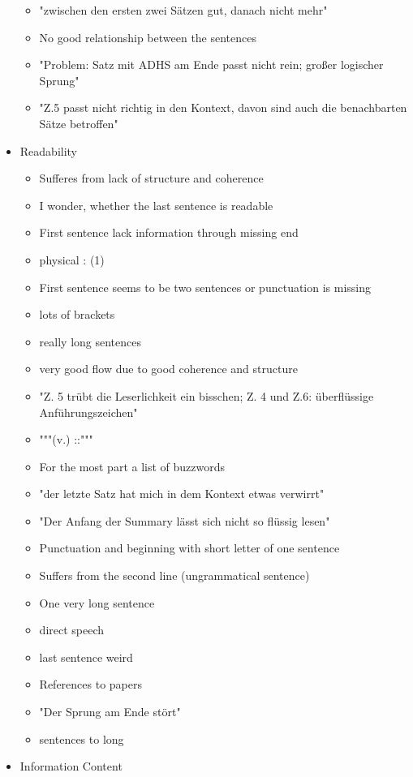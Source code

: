 \begin{itemize}[topsep = 0pt, itemsep = 0pt]
\begin{itemize}[topsep = 0pt, itemsep = 0pt]
		\item "zwischen den ersten zwei Sätzen gut, danach nicht mehr"
		\item No good relationship between the sentences
		\item "Problem: Satz mit ADHS am Ende passt nicht rein; großer logischer Sprung"
		\item "Z.5 passt nicht richtig in den Kontext, davon sind auch die benachbarten Sätze betroffen"
	\end{itemize}
	\item Readability
	\begin{itemize}[topsep = 0pt, itemsep = 0pt]
		\item Sufferes from lack of structure and coherence
		\item I wonder, whether the last sentence is readable
		\item First sentence lack information through missing end
		\item physical : (1)
		\item First sentence seems to be two sentences or punctuation is missing
		\item lots of brackets
		\item really long sentences
		\item very good flow due to good coherence and structure
		\item "Z. 5 trübt die Leserlichkeit ein bisschen; Z. 4 und Z.6: überflüssige Anführungszeichen"
		\item """(v.) ::"""
		\item For the most part a list of buzzwords
		\item "der letzte Satz hat mich in dem Kontext etwas verwirrt"
		\item "Der Anfang der Summary lässt sich nicht so flüssig lesen"
		\item Punctuation and beginning with short letter of one sentence
		\item Suffers from the second line (ungrammatical sentence)
		\item One very long sentence
		\item direct speech
		\item last sentence weird
		\item References to papers
		\item "Der Sprung am Ende stört"
		\item sentences to long
	\end{itemize}
	\item Information Content

\end{itemize}
